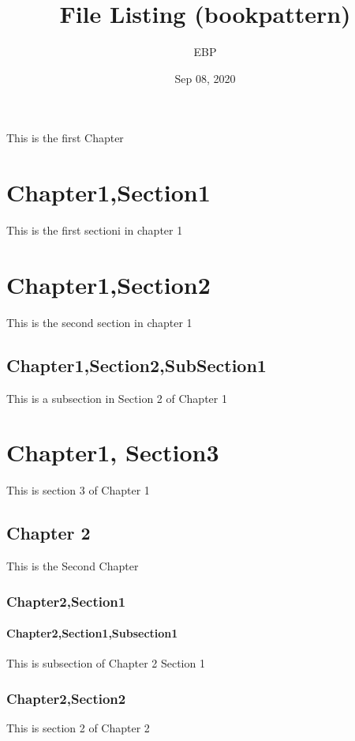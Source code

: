 \documentclass[letterpaper,10pt,english]{sphinxmanual}
\title{File Listing (bookpattern)}
\date{Sep 08, 2020}
\author{EBP}
\begin{document}
\pagestyle{empty}
\sphinxmaketitle
\pagestyle{plain}
\sphinxtableofcontents
\pagestyle{normal}
\label{\detokenize{chapter1::doc}}


This is the first Chapter


\chapter{Chapter1,Section1}
\label{\detokenize{chapter1:chapter1-section1}}
This is the first sectioni in chapter 1


\chapter{Chapter1,Section2}
\label{\detokenize{chapter1:chapter1-section2}}
This is the second section in chapter 1


\section{Chapter1,Section2,SubSection1}
\label{\detokenize{chapter1:chapter1-section2-subsection1}}
This is a subsection in Section 2 of Chapter 1


\chapter{Chapter1, Section3}
\label{\detokenize{chapter1:chapter1-section3}}
This is section 3 of Chapter 1


\section{Chapter 2}
\label{\detokenize{chapter2:chapter-2}}\label{\detokenize{chapter2::doc}}
This is the Second Chapter


\subsection{Chapter2,Section1}
\label{\detokenize{chapter2:chapter2-section1}}

\subsubsection{Chapter2,Section1,Subsection1}
\label{\detokenize{chapter2:chapter2-section1-subsection1}}
This is subsection of Chapter 2 Section 1


\subsection{Chapter2,Section2}
\label{\detokenize{chapter2:chapter2-section2}}
This is section 2 of Chapter 2
\end{document}
